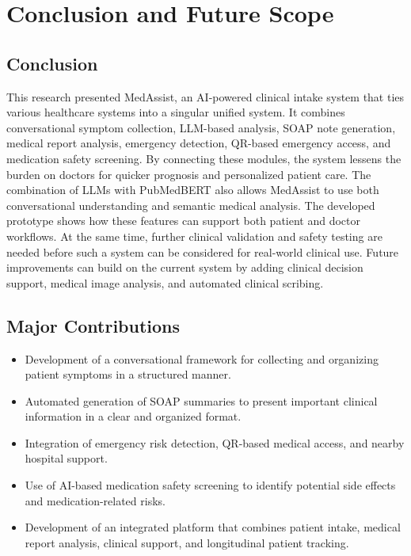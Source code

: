 \documentclass[conference]{IEEEtran}
\begin{document}
\FloatBarrier
\section{Conclusion and Future Scope}

\subsection{Conclusion}

This research presented MedAssist, an AI-powered clinical intake system that ties various healthcare systems into a singular unified system. It combines conversational symptom collection, LLM-based analysis, SOAP note generation, medical report analysis, emergency detection, QR-based emergency access, and medication safety screening. By connecting these modules, the system lessens the burden on doctors for quicker prognosis and personalized patient care. The combination of LLMs with PubMedBERT also allows MedAssist to use both conversational understanding and semantic medical analysis. The developed prototype shows how these features can support both patient and doctor workflows. At the same time, further clinical validation and safety testing are needed before such a system can be considered for real-world clinical use. Future improvements can build on the current system by adding clinical decision support, medical image analysis, and automated clinical scribing.

\subsection{Major Contributions}

\begin{itemize}
    \item Development of a conversational framework for collecting and organizing patient symptoms in a structured manner.

    \item Automated generation of SOAP summaries to present important clinical information in a clear and organized format.

    \item Integration of emergency risk detection, QR-based medical access, and nearby hospital support.

    \item Use of AI-based medication safety screening to identify potential side effects and medication-related risks.

    \item Development of an integrated platform that combines patient intake, medical report analysis, clinical support, and longitudinal patient tracking.
\end{itemize}
\end{document}
